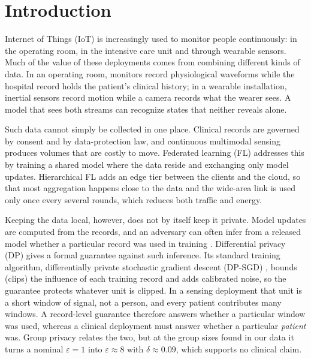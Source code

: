 \section{Introduction}
\label{sec:intro}

 Internet of Things (IoT) is increasingly used to monitor
people continuously: in the operating room, in the intensive care unit and
through wearable sensors. Much of the value of these deployments comes from
combining different kinds of data. In an operating room, monitors record
physiological waveforms while the hospital record holds the patient's
clinical history; in a wearable installation, inertial sensors record motion
while a camera records what the wearer sees. A model that sees both streams
can recognize states that neither reveals alone.

Such data cannot simply be collected in one place. Clinical records are
governed by consent and by data-protection law, and continuous multimodal
sensing produces volumes that are costly to move. Federated learning (FL)
\cite{ref1} addresses this by training a shared model where the data reside
and exchanging only model updates. Hierarchical FL \cite{ref2, ref3} adds an
edge tier between the clients and the cloud, so that most aggregation happens
close to the data and the wide-area link is used only once every several
rounds, which reduces both traffic and energy.

Keeping the data local, however, does not by itself keep it private. Model
updates are computed from the records, and an adversary can often infer from
a released model whether a particular record was used in training
\cite{ref14}. Differential privacy (DP) gives a formal guarantee against such
inference. Its standard training algorithm, differentially private stochastic
gradient descent (DP-SGD) \cite{ref6}, bounds (clips) the influence of each
training record and adds calibrated noise, so the guarantee protects whatever
unit is clipped. In a sensing deployment that unit is a short window of
signal, not a person, and every patient contributes many windows. A
record-level guarantee therefore answers whether a particular window was used,
whereas a clinical deployment must answer whether a particular
\emph{patient} was. Group privacy \cite{ref8} relates the two, but at the
group sizes found in our data it turns a nominal $\varepsilon = 1$ into
$\varepsilon \approx 8$ with $\delta \approx 0.09$, which supports no clinical
claim.

